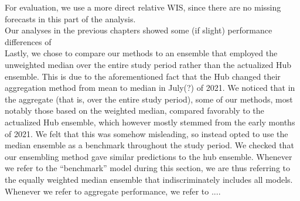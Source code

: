 For evaluation, we use a more direct relative WIS, since there are no missing forecasts in this part of the analysis.\\
Our analyses in the previous chapters showed some (if slight) performance differences of  \\
Lastly, we chose to compare our methods to an ensemble that employed the unweighted median over the entire study period rather than the actualized Hub ensemble. This is due to the aforementioned fact that the Hub changed their aggregation method from mean to median in July(?) of 2021. We noticed that in the aggregate (that is, over the entire study period), some of our methods, most notably those based on the weighted median, compared favorably to the actualized Hub ensemble, which however mostly stemmed from the early months of 2021. We felt that this was somehow misleading, so instead opted to use the median ensemble as a benchmark throughout the study period. We checked that our ensembling method gave similar predictions to the hub ensemble. Whenever we refer to the ``benchmark'' model during this section, we are thus referring to the equally weighted median ensemble that indiscriminately includes all models. Whenever we refer to aggregate performance, we refer to .... \\
